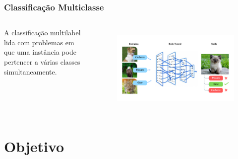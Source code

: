 \documentclass[aspectratio=169]{beamer}
\begin{document}
\begin{frame}
    \frametitle{Classificação Multiclasse}
    \begin{columns}

        A classificação multilabel lida com problemas em que uma instância pode pertencer a várias classes simultaneamente.

        \begin{figure}
            \centering
            \includegraphics[scale = 0.2 ]{img/multiclassel.png}
            \label{fig:enter-label}
        \end{figure}


    \end{columns}
\end{frame}




\section{Objetivo} %
\end{document}
